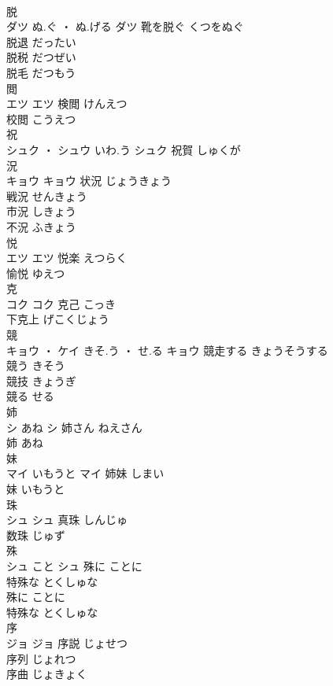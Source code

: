 \documentclass[8pt]{extreport}
\begin{document}
\begin{CJK}{UTF8}{min}
\\	脱	
\\	ダツ	ぬ.ぐ ・ ぬ.げる	ダツ	靴を脱ぐ	くつをぬぐ	
\\	脱退	だったい	
\\	脱税	だつぜい	
\\	脱毛	だつもう	
\\	閲	
\\	エツ		エツ	検閲	けんえつ	
\\	校閲	こうえつ	
\\	祝	
\\	シュク ・ シュウ	いわ.う	シュク													祝賀	しゅくが	
\\	況	
\\	キョウ		キョウ	状況	じょうきょう	
\\	戦況	せんきょう	
\\	市況	しきょう	
\\	不況	ふきょう	
\\	悦	
\\	エツ		エツ	悦楽	えつらく	
\\	愉悦	ゆえつ	
\\	克	
\\	コク		コク	克己	こっき	
\\	下克上	げこくじょう	
\\	競	
\\	キョウ ・ ケイ	きそ.う ・ せ.る	キョウ	競走する	きょうそうする	
\\	競う	きそう	
\\	競技	きょうぎ	
\\	競る	せる	
\\	姉	
\\	シ	あね	シ	姉さん	ねえさん	
\\	姉	あね	
\\	妹	
\\	マイ	いもうと	マイ	姉妹	しまい	
\\	妹	いもうと	
\\	珠	
\\	シュ		シュ	真珠	しんじゅ	
\\	数珠	じゅず	
\\	殊	
\\	シュ	こと	シュ	殊に	ことに	
\\	特殊な	とくしゅな	
\\	殊に	ことに	
\\	特殊な	とくしゅな	
\\	序	
\\	ジョ		ジョ	序説	じょせつ	
\\	序列	じょれつ	
\\	序曲	じょきょく	

\end{CJK}
\end{document}
